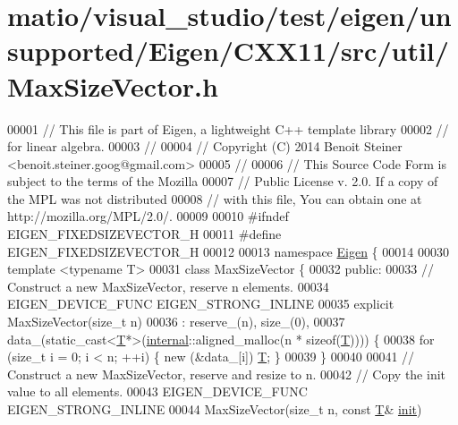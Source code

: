 \hypertarget{matio_2visual__studio_2test_2eigen_2unsupported_2_eigen_2_c_x_x11_2src_2util_2_max_size_vector_8h_source}{}\section{matio/visual\+\_\+studio/test/eigen/unsupported/\+Eigen/\+C\+X\+X11/src/util/\+Max\+Size\+Vector.h}
\label{matio_2visual__studio_2test_2eigen_2unsupported_2_eigen_2_c_x_x11_2src_2util_2_max_size_vector_8h_source}

\begin{DoxyCode}
00001 \textcolor{comment}{// This file is part of Eigen, a lightweight C++ template library}
00002 \textcolor{comment}{// for linear algebra.}
00003 \textcolor{comment}{//}
00004 \textcolor{comment}{// Copyright (C) 2014 Benoit Steiner <benoit.steiner.goog@gmail.com>}
00005 \textcolor{comment}{//}
00006 \textcolor{comment}{// This Source Code Form is subject to the terms of the Mozilla}
00007 \textcolor{comment}{// Public License v. 2.0. If a copy of the MPL was not distributed}
00008 \textcolor{comment}{// with this file, You can obtain one at http://mozilla.org/MPL/2.0/.}
00009 
00010 \textcolor{preprocessor}{#ifndef EIGEN\_FIXEDSIZEVECTOR\_H}
00011 \textcolor{preprocessor}{#define EIGEN\_FIXEDSIZEVECTOR\_H}
00012 
00013 \textcolor{keyword}{namespace }\hyperlink{namespace_eigen}{Eigen} \{
00014 
00030 \textcolor{keyword}{template} <\textcolor{keyword}{typename} T>
00031 \textcolor{keyword}{class }MaxSizeVector \{
00032  \textcolor{keyword}{public}:
00033   \textcolor{comment}{// Construct a new MaxSizeVector, reserve n elements.}
00034   EIGEN\_DEVICE\_FUNC EIGEN\_STRONG\_INLINE
00035   \textcolor{keyword}{explicit} MaxSizeVector(\textcolor{keywordtype}{size\_t} n)
00036       : reserve\_(n), size\_(0),
00037         data\_(static\_cast<\hyperlink{group___sparse_core___module_class_eigen_1_1_triplet}{T}*>(\hyperlink{namespaceinternal}{internal}::aligned\_malloc(n * sizeof(\hyperlink{group___sparse_core___module_class_eigen_1_1_triplet}{T})))) \{
00038     \textcolor{keywordflow}{for} (\textcolor{keywordtype}{size\_t} i = 0; i < n; ++i) \{ \textcolor{keyword}{new} (&data\_[i]) \hyperlink{group___sparse_core___module_class_eigen_1_1_triplet}{T}; \}
00039   \}
00040 
00041   \textcolor{comment}{// Construct a new MaxSizeVector, reserve and resize to n.}
00042   \textcolor{comment}{// Copy the init value to all elements.}
00043   EIGEN\_DEVICE\_FUNC EIGEN\_STRONG\_INLINE
00044   MaxSizeVector(\textcolor{keywordtype}{size\_t} n, \textcolor{keyword}{const} \hyperlink{group___sparse_core___module_class_eigen_1_1_triplet}{T}& \hyperlink{structinit}{init})

\end{DoxyCode}
